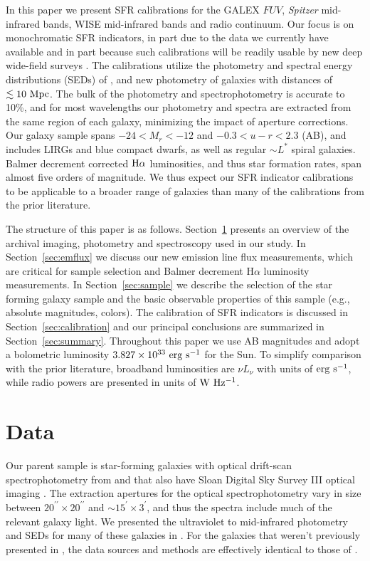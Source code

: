 \documentclass[preprint]{aastex61}
\begin{document}
In this paper we present SFR calibrations for the GALEX $FUV$, {\it Spitzer} mid-infrared bands, WISE mid-infrared bands and radio continuum. Our focus is on monochromatic SFR indicators, in part due to the data we currently have available and in part because such calibrations will be readily usable by new deep wide-field surveys \citep[e.g.,][]{nor11,wil16}. The calibrations utilize the photometry and spectral energy distributions (SEDs) of \citet{bro14}, and new photometry of galaxies with distances of $\lesssim 10~{\rm Mpc}$. The bulk of the photometry and spectrophotometry is accurate to 10\%, and for most wavelengths our photometry and spectra are extracted from the same region of each galaxy, minimizing the impact of aperture corrections. Our galaxy sample spans $-24<M_r<-12$ and $-0.3<u-r<2.3$ (AB), and includes LIRGs and blue compact dwarfs, as well as regular $\sim L^*$ spiral galaxies. Balmer decrement corrected ${\rm H\alpha}$ luminosities, and thus star formation rates, span almost five orders of magnitude. We thus expect our SFR indicator calibrations to be applicable to a broader range of galaxies than many of the calibrations from the prior literature. 

The structure of this paper is as follows. Section~\ref{sec:data} presents an overview of the archival imaging, photometry and spectroscopy used in our study. In Section~\ref{sec:emflux} we discuss our new emission line flux measurements, which are critical for sample selection and Balmer decrement H$\alpha$ luminosity measurements. In Section~\ref{sec:sample} we describe the selection of the star forming galaxy sample and the basic observable properties of this sample (e.g., absolute magnitudes, colors). The calibration of SFR indicators is discussed in Section~\ref{sec:calibration} and our principal conclusions are summarized in Section~\ref{sec:summary}. Throughout this paper we use AB magnitudes and adopt a bolometric luminosity $3.827\times 10^{33}~{\rm erg~s^{-1}}$ for the Sun. To simplify comparison with the prior literature, broadband luminosities are $\nu L_\nu$ with units of ${\rm erg~s^{-1}}$, while radio powers are presented in units of ${\rm W~Hz^{-1}}$. 

\section{Data}
\label{sec:data}

Our parent sample is star-forming galaxies with optical drift-scan spectrophotometry from \citet{mou06} and \citet{mou10} that also have Sloan Digital Sky Survey III optical imaging \citep[SDSS III;][]{sdss3}. The extraction apertures for the optical spectrophotometry vary in size between $20^{\prime\prime} \times 20^{\prime\prime}$ and $\sim 15^{\prime} \times 3^{\prime}$, and thus the spectra include much of the relevant galaxy light. We presented the ultraviolet to mid-infrared photometry and SEDs for many of these galaxies in \citet{bro14}. For the galaxies that weren't previously presented in \citet{bro14}, the data sources and methods are effectively identical to those of \citet{bro14}.
\end{document}

